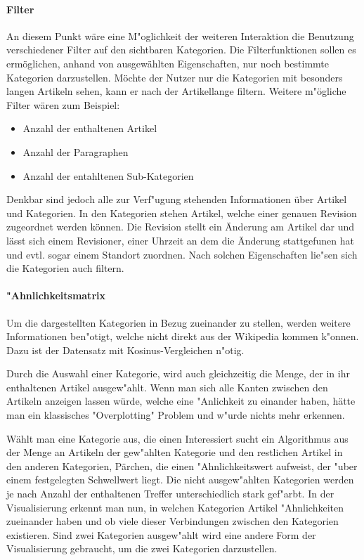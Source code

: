 \paragraph{Filter}

An diesem Punkt wäre eine M"oglichkeit der weiteren Interaktion die Benutzung verschiedener Filter auf den sichtbaren Kategorien.
Die Filterfunktionen sollen es ermöglichen, anhand von ausgewählten Eigenschaften, nur noch bestimmte Kategorien darzustellen.
Möchte der Nutzer nur die Kategorien mit besonders langen Artikeln sehen, kann er nach der Artikellange filtern. Weitere m"ögliche Filter wären zum Beispiel:
\begin{itemize}
    \item Anzahl der enthaltenen Artikel 
    \item Anzahl der Paragraphen
    \item Anzahl der entahltenen Sub-Kategorien
\end{itemize}

Denkbar sind jedoch alle zur Verf"ugung stehenden Informationen über Artikel und Kategorien.
In den Kategorien stehen Artikel, welche einer genauen Revision zugeordnet werden können. Die Revision stellt ein Änderung am Artikel dar
und lässt sich einem Revisioner, einer Uhrzeit an dem die Änderung stattgefunen hat und evtl. sogar einem Standort zuordnen.
Nach solchen Eigenschaften lie"sen sich die Kategorien auch filtern.

\paragraph{"Ahnlichkeitsmatrix}

Um die dargestellten Kategorien in Bezug zueinander zu stellen, werden weitere Informationen ben"otigt, welche nicht direkt aus der 
Wikipedia kommen k"onnen. Dazu ist der Datensatz mit Kosinus-Vergleichen n"otig.

Durch die Auswahl einer Kategorie, wird auch gleichzeitig die Menge, der in ihr enthaltenen Artikel ausgew"ahlt.
Wenn man sich alle Kanten zwischen den Artikeln anzeigen lassen würde, welche eine "Anlichkeit zu einander haben, hätte man ein klassisches "Overplotting" Problem und w"urde nichts mehr erkennen.

Wählt man eine Kategorie aus, die einen Interessiert sucht ein Algorithmus aus der Menge an Artikeln der gew"ahlten Kategorie und den restlichen Artikel in den anderen Kategorien,  Pärchen, die einen "Ahnlichkeitswert aufweist, der "uber einem festgelegten Schwellwert liegt.
Die nicht ausgew"ahlten Kategorien werden je nach Anzahl der enthaltenen Treffer unterschiedlich stark gef"arbt.
In der Visualisierung erkennt man nun, in welchen Kategorien Artikel "Ahnlichkeiten zueinander haben und ob viele dieser Verbindungen zwischen den Kategorien existieren.
Sind zwei Kategorien ausgew"ahlt wird eine andere Form der Visualisierung gebraucht, um die zwei Kategorien darzustellen.


